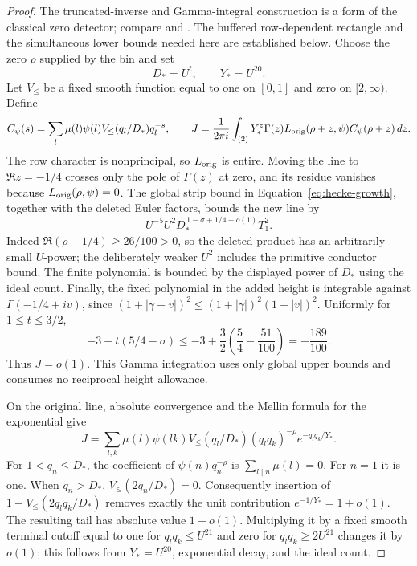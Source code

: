 \documentclass[11pt,a4paper]{article}
\numberwithin{equation}{section}
\numberwithin{figure}{section}
\theoremstyle{definition}
\theoremstyle{remark}
\begin{document}
\begin{proof}
The truncated-inverse and Gamma-integral construction is a form of the
classical zero detector; compare \cite[Appendix C]{MP}
and \cite[Section~13.1]{GM}.  The buffered row-dependent rectangle and
the simultaneous lower bounds needed here are established below.
Choose the zero \(\rho\) supplied by the bin and set
\[
 D_*=U^t,\qquad Y_*=U^{20}.
\]
Let \(V_{\le}\) be a fixed smooth function equal to one on
\([0,1]\) and zero on \([2,\infty)\).  Define
\[
 C_\psi(s)=\sum_l\mu(l)\psi(l)V_{\le}(q_l/D_*)q_l^{-s},
 \qquad
 J=\frac1{2\pi i}\int_{(2)}
       Y_*^z\Gamma(z)L_{\rm orig}(\rho+z,\psi)
       C_\psi(\rho+z)\,dz.
\]
The row character is nonprincipal, so \(L_{\rm orig}\) is entire.
Moving the line to \(\Re z=-1/4\) crosses only the pole of
\(\Gamma(z)\) at zero, and its residue vanishes because
\(L_{\rm orig}(\rho,\psi)=0\).  The global strip bound
in Equation~\eqref{eq:hecke-growth}, together with the deleted
Euler factors, bounds the new line by
\[
 U^{-5}U^2D_*^{\,1-\sigma+1/4+o(1)}T_1^2.
\]
Indeed \(\Re(\rho-1/4)\ge26/100>0\), so the deleted product has
an arbitrarily small \(U\)-power; the deliberately weaker
\(U^2\) includes the primitive conductor bound.  The finite
polynomial is bounded by the displayed power of \(D_*\) using the
ideal count.  Finally, the fixed polynomial in the added height is
integrable against \(\Gamma(-1/4+iv)\), since
\((1+|\gamma+v|)^2\le(1+|\gamma|)^2(1+|v|)^2\).
Uniformly for \(1\le t\le3/2\),
\[
 -3+t(5/4-\sigma)
 \le-3+\frac32\left(\frac54-\frac{51}{100}\right)
 =-\frac{189}{100}.
\]
Thus \(J=o(1)\).  This Gamma integration uses only global upper
bounds and consumes no reciprocal height allowance.

On the original line, absolute convergence and the Mellin formula
for the exponential give
\[
 J=\sum_{l,k}\mu(l)\psi(lk)V_{\le}(q_l/D_*)
       (q_lq_k)^{-\rho}e^{-q_lq_k/Y_*}.
\]
For \(1<q_n\le D_*\), the coefficient of \(\psi(n)q_n^{-\rho}\)
is \(\sum_{l\mid n}\mu(l)=0\).  For \(n=1\) it is one.
When \(q_n>D_*\), \(V_{\le}(2q_n/D_*)=0\).
Consequently insertion of \(1-V_{\le}(2q_lq_k/D_*)\) removes
exactly the unit contribution \(e^{-1/Y_*}=1+o(1)\).
The resulting tail has absolute value \(1+o(1)\).
Multiplying it by a fixed smooth terminal cutoff equal to one for
\(q_lq_k\le U^{21}\) and zero for \(q_lq_k\ge2U^{21}\) changes it
by \(o(1)\); this follows from \(Y_*=U^{20}\), exponential decay,
and the ideal count.


\end{proof}
\end{document}
